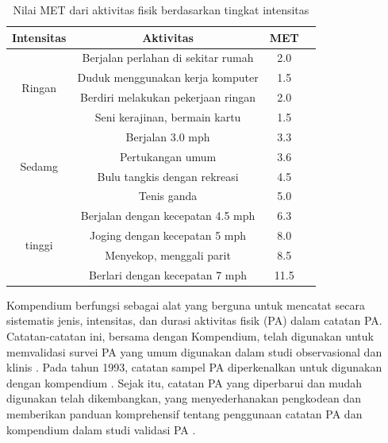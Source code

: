 \begin{longtable}{|c|c|c|c|}
  \caption{Nilai MET dari aktivitas fisik berdasarkan tingkat intensitas}
  \label{tb:metintensitas}  \\
  \hline
  \rowcolor[HTML]{C0C0C0}
  \textbf{Intensitas} & \textbf{Aktivitas} & \textbf{MET} \\
  \hline
  \multirow{4}{*}{Ringan}     & Berjalan perlahan di sekitar rumah      & 2.0     \\
  \cline{2-3} &
                                Duduk menggunakan kerja komputer        & 1.5     \\
  \cline{2-3} &
                                Berdiri melakukan pekerjaan ringan      & 2.0     \\
  \cline{2-3} &
                                Seni kerajinan, bermain kartu           & 1.5    \\
  \hline
  \multirow{4}{*}{Sedamg}     & Berjalan 3.0 mph                        & 3.3     \\
  \cline{2-3} &
                                Pertukangan umum                        & 3.6    \\
  \cline{2-3} &
                                Bulu tangkis dengan rekreasi            & 4.5    \\
  \cline{2-3} &
                                Tenis ganda                             & 5.0    \\
  \hline
  \multirow{4}{*}{tinggi}     & Berjalan dengan kecepatan 4.5 mph       & 6.3    \\
  \cline{2-3} &
                                Joging dengan kecepatan 5 mph           & 8.0    \\
  \cline{2-3} &
                                Menyekop, menggali parit                & 8.5    \\
  \cline{2-3} &
                                Berlari dengan kecepatan 7 mph          & 11.5    \\
  \hline
\end{longtable}

Kompendium berfungsi sebagai alat yang berguna untuk mencatat secara sistematis jenis, intensitas, dan durasi aktivitas fisik (PA) dalam catatan PA. Catatan-catatan ini, bersama dengan Kompendium, telah digunakan untuk memvalidasi survei PA yang umum digunakan dalam studi observasional dan klinis \parencite{Ainsworth2}. Pada tahun 1993, catatan sampel PA diperkenalkan untuk digunakan dengan kompendium \parencite{Ainsworth}. Sejak itu, catatan PA yang diperbarui dan mudah digunakan telah dikembangkan, yang menyederhanakan pengkodean dan memberikan panduan komprehensif tentang penggunaan catatan PA dan kompendium dalam studi validasi PA \parencite{Ainsworth2}.


